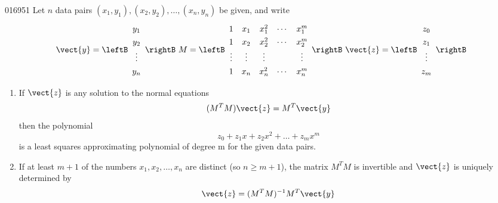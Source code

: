 \begin{theorem}{}{016951} %
Let $n$ data pairs $(x_{1}, y_{1}), (x_{2}, y_{2}), \dots, (x_{n}, y_{n})$ be given, and write
\begin{equation*}
\vect{y} = 
\leftB \begin{array}{c}
y_1 \\
y_2 \\
\vdots \\
y_n
\end{array} \rightB
\ M = 
\def\arraystretch{1.3}
\leftB \begin{array}{ccccc}
1 & x_1 & x_1^2 & \cdots & x_1^m \\
1 & x_2 & x_2^2 & \cdots & x_2^m \\
\vdots & \vdots & \vdots & & \vdots \\
1 & x_n & x_n^2 & \cdots & x_n^m \\
\end{array} \rightB
\ \vect{z} = 
\leftB \begin{array}{c}
z_0 \\
z_1 \\
\vdots \\
z_m
\end{array} \rightB
\end{equation*}
\begin{enumerate}
\item If $\vect{z}$ is any solution to the normal equations
\begin{equation*}
(M^TM)\vect{z} = M^T\vect{y}
\end{equation*}
then the polynomial
\begin{equation*}
z_0 + z_1x + z_2x^2 + \dots + z_mx^m
\end{equation*}
is a least squares approximating polynomial of degree m for the given data pairs.

\item If at least $m + 1$ of the numbers $x_{1}, x_{2}, \dots, x_{n}$ are distinct (so $n \geq m + 1$), the matrix $M^{T}M$ is invertible and $\vect{z}$ is uniquely determined by
\begin{equation*}
\vect{z} = (M^TM)^{-1}M^T\vect{y}
\end{equation*}
\end{enumerate}
\end{theorem}

